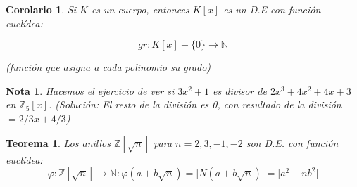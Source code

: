 \documentclass[11pt, a4paper, titlepage]{article}
\providecommand{\ent}{\mathbb{Z}}
\providecommand{\nat}{\mathbb{N}}
\providecommand{\abs}[1]{\lvert#1\rvert}
\theoremstyle{theorem-style}
\newtheorem*{nth}{Teorema}
\newtheorem{ncor}{Corolario}
\theoremstyle{definition-style}
\theoremstyle{remark-style}
\newtheorem*{nota}{Nota}
\theoremstyle{example-style}
\begin{document}
\begin{ncor}
	Si $K$ es un cuerpo, entonces $K[x]$ es un D.E con función euclídea:
	
	\[
	gr: K[x]-\{0\} \to \nat
	\]
	
(función que asigna a cada polinomio su grado)
\end{ncor}

\begin{nota}
	Hacemos el ejercicio de ver si $3x^2 +1$ es divisor de $2x^3 + 4x^2 +4x +3$ en $\ent _5[x]$. (Solución: El resto de la división es 0, con resultado de la división $= 2/3 x + 4/3$)
\end{nota}


\begin{nth}
	Los anillos $\ent[\sqrt{n}]$ para $n=2,3,-1,-2$ son D.E. con función euclídea:
	\[
	\varphi: \ent[\sqrt{n}] \to \nat : \varphi(a+b\sqrt{n}) = \abs{N(a+b\sqrt{n})} = \abs{a^2 - nb^2}
	\]
	
	
\end{nth}
\end{document}
